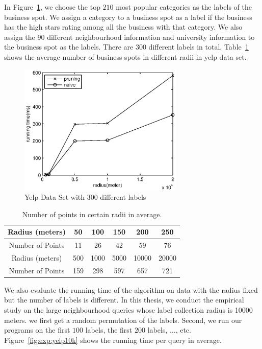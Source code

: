 In Figure~\ref{fig:exp:yelp300l}, we choose the top $210$ most popular categories as the labels of the business spot. We assign a category to a business spot as a label if the business has the high stars rating among all the business with that category. We also assign the $90$ different neighbourhood information and university information to the business spot as the labels. There are 300 different labels in total. Table~\ref{tab:exp:radius} shows the average number of business spots in different radii in yelp data set.

\begin{figure}[h]
    \centering
      \includegraphics[width=0.7\textwidth]{figs/Yelp300Labels}
    \caption{Yelp Data Set with 300 different labels}
    \label{fig:exp:yelp300l}
\end{figure}


\begin{table}[h]
\centering
\begin{tabular}{|c|c|c|c|c|c|}
\hline
Radius (meters)  & 50  & 100  & 150  & 200   & 250   \\ \hline
Number of Points & 11  & 26   & 42   & 59    & 76    \\ \hline
Radius (meters)  & 500 & 1000 & 5000 & 10000 & 20000 \\ \hline
Number of Points & 159 & 298  & 597  & 657   & 721  \\ \hline
\end{tabular}
\caption{Number of points in certain radii in average.}
\label{tab:exp:radius}
\end{table}

We also evaluate the running time of the algorithm on data with the radius fixed but the number of labels is different. In this thesis, we conduct the empirical study on the large neighbourhood queries whose label collection radius is 10000 meters. we first get a random permutation of the labels. Second, we run our programs on the first $100$ labels, the first $200$ labels, $\dots$, etc. Figure~\ref{fig:exp:yelp10k} shows the running time per query in average.

